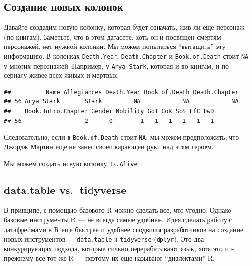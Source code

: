 \documentclass[]{book}
\newenvironment{Shaded}{\begin{snugshade}}{\end{snugshade}}
\newcommand{\KeywordTok}[1]{\textcolor[rgb]{0.13,0.29,0.53}{\textbf{#1}}}
\newcommand{\NormalTok}[1]{#1}
\newcommand{\OperatorTok}[1]{\textcolor[rgb]{0.81,0.36,0.00}{\textbf{#1}}}
\newcommand{\StringTok}[1]{\textcolor[rgb]{0.31,0.60,0.02}{#1}}
\begin{document}
\hypertarget{newcol}{%
\subsection{Создание новых колонок}\label{newcol}}

Давайте создадим новую колонку, которая будет означать, жив ли еще персонаж (по книгам).
Заметьте, что в этом датасете, хоть он и посвящен смертям персонажей, нет нужной колонки. Мы можем попытаться ``вытащить'' эту информацию. В колонках \texttt{Death.Year}, \texttt{Death.Chapter} и \texttt{Book.of.Death} стоит \texttt{NA} у многих персонажей. Например, у \texttt{Arya\ Stark}, которая и по книгам, и по сериалу живее всех живых и мертвых:

\begin{Shaded}
\end{Shaded}

\begin{verbatim}
##          Name Allegiances Death.Year Book.of.Death Death.Chapter
## 56 Arya Stark       Stark         NA            NA            NA
##    Book.Intro.Chapter Gender Nobility GoT CoK SoS FfC DwD
## 56                  2      0        1   1   1   1   1   1
\end{verbatim}

Следовательно, если в \texttt{Book.of.Death} стоит \texttt{NA}, мы можем предположить, что Джордж Мартин еще не занес своей карающей руки над этим героем.

Мы можем создать новую колонку \texttt{Is.Alive}:

\begin{Shaded}
\end{Shaded}

\hypertarget{dtvstidy}{%
\subsection{data.table vs.~tidyverse}\label{dtvstidy}}

В принципе, с помощью базового R можно сделать все, что угодно. Однако базовые инструменты R --- не всегда самые удобные. Идея сделать работу с датафреймами в R еще быстрее и удобнее сподвигла разработчиков на создание новых инструментов --- \texttt{data.table} и \texttt{tidyverse} (\texttt{dplyr}). Это два конкурирующих подхода, которые сильно перерабатывают язык, хотя это по-прежнему все тот же R --- поэтому их еще называют ``диалектами'' R.
\end{document}
